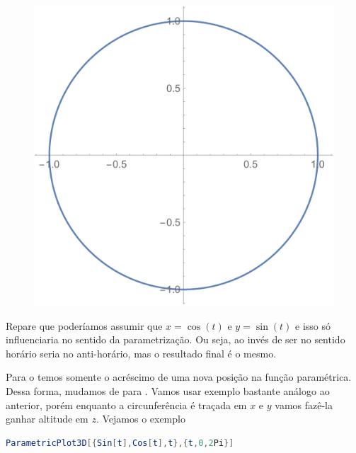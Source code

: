 \documentclass[a4paper, 12pt]{article}
\begin{document}
\begin{figure}[!h]
	\centering
	\includegraphics[scale=.5]{images/ParametricPlot}
\end{figure}

Repare que poderíamos assumir que $x=\cos(t)$ e $y=\sin(t)$ e isso só influenciaria no sentido da parametrização. Ou seja, ao invés de ser no sentido horário seria no anti-horário, mas o resultado final é o mesmo.

Para o  temos somente o acréscimo de uma nova posição na função paramétrica. Dessa forma, mudamos de  para . Vamos usar exemplo bastante análogo ao anterior, porém enquanto a circunferência é traçada em $x$ e $y$ vamos fazê-la ganhar altitude em $z$. Vejamos o exemplo

\begin{lstlisting}[language=Mathematica]
ParametricPlot3D[{Sin[t],Cos[t],t},{t,0,2Pi}]
\end{lstlisting}
\end{document}

